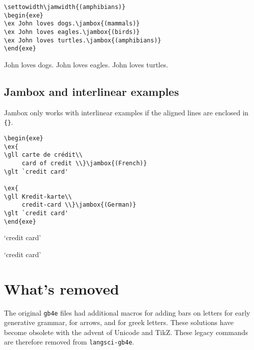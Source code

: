 \documentclass[output=paper]{langscibook}
\begin{document}
\begin{lstlisting}
\settowidth\jamwidth{(amphibians)}
\begin{exe}
\ex John loves dogs.\jambox{(mammals)}
\ex John loves eagles.\jambox{(birds)}
\ex John loves turtles.\jambox{(amphibians)}
\end{exe}
 \end{lstlisting}

\begin{exe}
\settowidth{}
\ex John loves dogs.
\ex John loves eagles.
\ex John loves turtles.
\end{exe}


\subsection{Jambox and interlinear examples}
Jambox only works with interlinear examples if the aligned lines are enclosed in \texttt{\{\}}.

\begin{lstlisting}
\begin{exe}
\ex{
\gll carte de crédit\\
     card of credit \\}\jambox{(French)}
\glt `credit card'

\ex{
\gll Kredit-karte\\
     credit-card \\}\jambox{(German)}
\glt `credit card'
\end{exe}
 \end{lstlisting}

\begin{exe}
\glt `credit card'

\glt `credit card'
\end{exe}




\section{What's removed}
The original \texttt{gb4e} files had additional macros for adding bars on letters for early generative grammar, for arrows, and for greek letters. These solutions have become obsolete with the advent of Unicode and TikZ. These legacy commands are therefore removed from \texttt{langsci-gb4e}.
\end{document}
